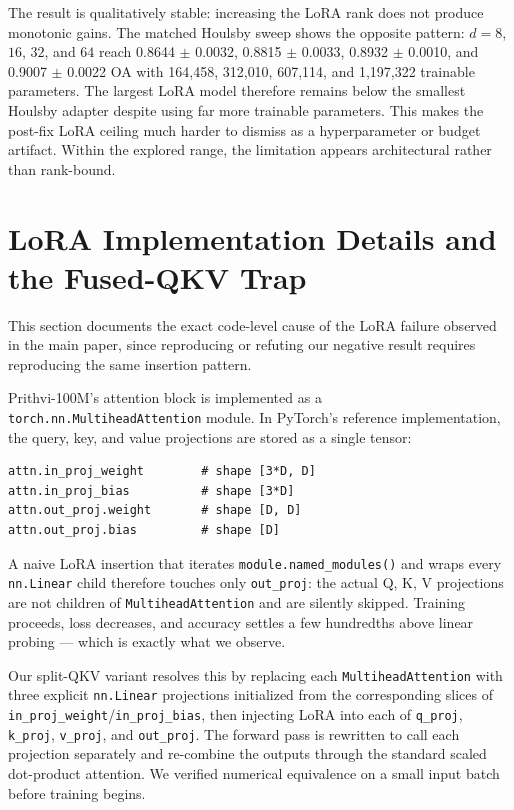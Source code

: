 \documentclass[11pt]{article}
\begin{document}
The result is qualitatively stable: increasing the LoRA rank does not produce monotonic gains. The matched Houlsby sweep shows the opposite pattern: $d=8$, $16$, $32$, and $64$ reach 0.8644 $\pm$ 0.0032, 0.8815 $\pm$ 0.0033, 0.8932 $\pm$ 0.0010, and 0.9007 $\pm$ 0.0022 OA with 164{,}458, 312{,}010, 607{,}114, and 1{,}197{,}322 trainable parameters. The largest LoRA model therefore remains below the smallest Houlsby adapter despite using far more trainable parameters. This makes the post-fix LoRA ceiling much harder to dismiss as a hyperparameter or budget artifact. Within the explored range, the limitation appears architectural rather than rank-bound.

\section{LoRA Implementation Details and the Fused-QKV Trap}
\label{app:lora-trap}

This section documents the exact code-level cause of the LoRA failure observed in the main paper, since reproducing or refuting our negative result requires reproducing the same insertion pattern.

Prithvi-100M's attention block is implemented as a \texttt{torch.nn.MultiheadAttention} module. In PyTorch's reference implementation, the query, key, and value projections are stored as a single tensor:

\begin{verbatim}
attn.in_proj_weight        # shape [3*D, D]
attn.in_proj_bias          # shape [3*D]
attn.out_proj.weight       # shape [D, D]
attn.out_proj.bias         # shape [D]
\end{verbatim}

A naive LoRA insertion that iterates \texttt{module.named\_modules()} and wraps every \texttt{nn.Linear} child therefore touches only \texttt{out\_proj}: the actual Q, K, V projections are not children of \texttt{MultiheadAttention} and are silently skipped. Training proceeds, loss decreases, and accuracy settles a few hundredths above linear probing --- which is exactly what we observe.

Our split-QKV variant resolves this by replacing each \texttt{MultiheadAttention} with three explicit \texttt{nn.Linear} projections initialized from the corresponding slices of \texttt{in\_proj\_weight}/\texttt{in\_proj\_bias}, then injecting LoRA into each of \texttt{q\_proj}, \texttt{k\_proj}, \texttt{v\_proj}, and \texttt{out\_proj}. The forward pass is rewritten to call each projection separately and re-combine the outputs through the standard scaled dot-product attention. We verified numerical equivalence on a small input batch before training begins.
\end{document}
